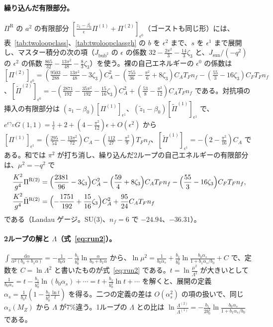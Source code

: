 \documentclass[a4paper,10pt]{ltjsarticle}
\newcommand{\dd}{\mathrm{d}}
\begin{document}
\paragraph{繰り込んだ有限部分。}$\Pi^{\mathrm R}$ の $a^2$ の有限部分 $[\frac{z_1-\beta_0}\epsilon\Pi^{(1)}+\Pi^{(2)}]_{\epsilon^0}$（ゴーストも同じ形）には、表~\ref{tab:twoloopclass}、\ref{tab:twoloopclassgh} の $b$ を $\epsilon^2$ まで、$s$ を $\epsilon^1$ まで展開し、マスター積分の次の項（$J_{\mathrm{bub}^2}$ の $\epsilon$ の係数 $32-\frac{2\pi^2}3-\frac{14}3\zeta_3$ と、$J_{\mathrm{sun}}/(-q^2)$ の $\epsilon^2$ の係数 $\frac{865}{32}-\frac{13\pi^2}{48}-\frac83\zeta_3$）を使う。裸の自己エネルギーの $\epsilon^0$ の係数は $[\Pi^{(2)}]_{\epsilon^0}=(\frac{9503}{288}-\frac{13\pi^2}{48}-3\zeta_3)C_A^2-(\frac{755}{36}-\frac{\pi^2}6+8\zeta_3)C_AT_Fn_f-(\frac{55}3-16\zeta_3)C_FT_Fn_f$、$[\tilde\Pi^{(2)}]_{\epsilon^0}=-(\frac{2871}{192}-\frac{35\pi^2}{192}-\frac{15}{16}\zeta_3)C_A^2+(\frac{53}8-\frac{\pi^2}{12})C_AT_Fn_f$ である。対抗項の挿入の有限部分は $(z_1-\beta_0)[\Pi^{(1)}]_{\epsilon^1}$、$(\tilde z_1-\beta_0)[\tilde\Pi^{(1)}]_{\epsilon^1}$ で、$e^{\epsilon\gamma_E}G(1,1)=\frac1\epsilon+2+(4-\frac{\pi^2}{12})\epsilon+O(\epsilon^2)$ から $[\Pi^{(1)}]_{\epsilon^1}=(\frac{295}{54}-\frac{13\pi^2}{72})C_A-(\frac{112}{27}-\frac{\pi^2}9)T_Fn_f$、$[\tilde\Pi^{(1)}]_{\epsilon^1}=-(2-\frac{\pi^2}{16})C_A$ である。和では $\pi^2$ が打ち消し、繰り込んだ2ループの自己エネルギーの有限部分は、$\mu^2=-q^2$ で
\begin{equation*}
\begin{aligned}
\frac{K^2}{g^4}\Pi^{\mathrm R(2)}&=\Bigl(\frac{2381}{96}-3\zeta_3\Bigr)C_A^2-\Bigl(\frac{59}4+8\zeta_3\Bigr)C_AT_Fn_f-\Bigl(\frac{55}3-16\zeta_3\Bigr)C_FT_Fn_f,\\
\frac{K^2}{g^4}\tilde\Pi^{\mathrm R(2)}&=\Bigl(-\frac{1751}{192}+\frac{15}{16}\zeta_3\Bigr)C_A^2+\frac{95}{24}C_AT_Fn_f
\end{aligned}
\end{equation*}
である（Landau ゲージ。SU(3)、$n_f=6$ で $-24.94$、$-36.31$）。

\paragraph{2ループの解と $\Lambda$（式~\eqref{eq:run2}）。}$\int\frac{\dd\alpha}{\alpha^2(b_0+b_1\alpha)}=-\frac1{b_0\alpha}-\frac{b_1}{b_0^2}\ln\frac{\alpha}{b_0+b_1\alpha}$ から、$\ln\mu^2=\frac1{b_0\alpha_s}+\frac{b_1}{b_0^2}\ln\frac{b_0\alpha_s}{1+b_1\alpha_s/b_0}+C$ で、定数を $C=\ln\Lambda^2$ と書いたものが式~\eqref{eq:run2} である。$t=\ln\frac{\mu^2}{\Lambda^2}$ が大きいとして $\frac1{b_0\alpha_s}=t-\frac{b_1}{b_0^2}\ln(b_0\alpha_s)+\cdots=t+\frac{b_1}{b_0^2}\ln t+\cdots$ を解くと、展開の定義 $\alpha_s=\frac1{b_0t}(1-\frac{b_1}{b_0^2}\frac{\ln t}t)$ を得る。二つの定義の差は $O(\alpha_s^2)$ の項の扱いで、同じ $\alpha_s(M_Z)$ から $\Lambda$ が7\%違う。1ループの $\Lambda$ との比は $\ln\frac{\Lambda^{(2)}}{\Lambda^{(1)}}=-\frac{b_1}{2b_0^2}\ln\frac{b_0\alpha_s}{1+b_1\alpha_s/b_0}$ である。
\end{document}
